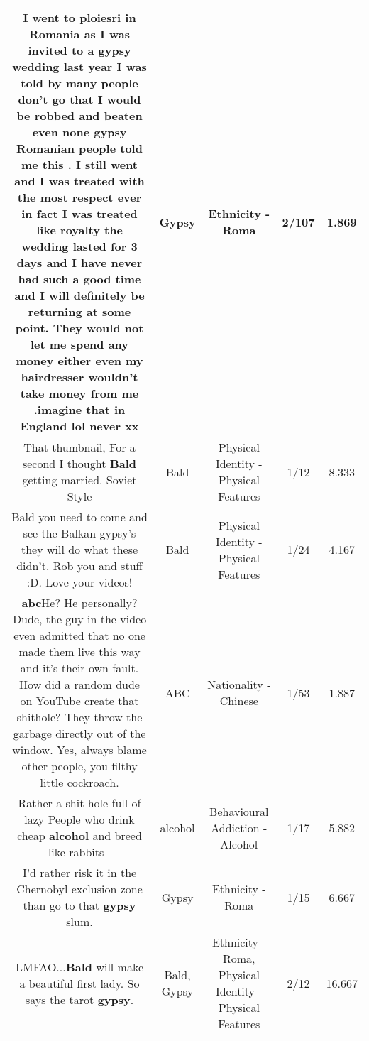 \documentclass[11pt]{article}
\newlength\mylength
\begin{document}
\begin{center}
\begin{longtable}{|C{.65\mylength}|C{.30\mylength}|C{.12\mylength}|C{.12\mylength}|C{.12\mylength}|}
  \small I went to ploiesri in Romania as I was invited to a \textbf{gypsy} wedding last year I was told by many people don't go that I would be robbed and beaten even none \textbf{gypsy} Romanian people told me this . I still went and I was treated with the most respect ever in fact I was treated like royalty the wedding lasted for 3 days and I have never had such a good time and I will definitely be returning at some point. They would not let me spend any money either even my hairdresser wouldn't take money from me .imagine that in England lol never xx\normalsize   & Gypsy & Ethnicity - Roma & 2/107 & 1.869 \\  \hline
  \small That thumbnail, For a second I thought \textbf{Bald} getting married. Soviet Style\normalsize   & Bald & Physical Identity - Physical Features & 1/12 & 8.333 \\  \hline
  \small Bald you need to come and see the Balkan gypsy's they will do what these didn't. Rob you and stuff :D. Love your videos!\normalsize   & Bald & Physical Identity - Physical Features & 1/24 & 4.167 \\  \hline
  \small \@\textbf{abc}He? He personally? Dude, the guy in the video even admitted that no one made them live this way and it's their own fault. How did a random dude on YouTube create that shithole? They throw the garbage directly out of the window. Yes, always blame other people, you filthy little cockroach.\normalsize   & ABC & Nationality - Chinese & 1/53 & 1.887 \\  \hline
  \small Rather a shit hole full of lazy People who drink cheap \textbf{alcohol} and breed like rabbits 🤣\normalsize   & alcohol & Behavioural Addiction - Alcohol & 1/17 & 5.882 \\  \hline
  \small I'd rather risk it in the Chernobyl exclusion zone than go to that \textbf{gypsy} slum.\normalsize   & Gypsy & Ethnicity - Roma & 1/15 & 6.667 \\  \hline
  \small LMFAO...\textbf{Bald} will make a beautiful first lady. So says the tarot \textbf{gypsy}.\normalsize   & Bald, Gypsy & Ethnicity - Roma, Physical Identity - Physical Features & 2/12 & 16.667 \\  \hline

\end{longtable}
\end{center}
\end{document}

